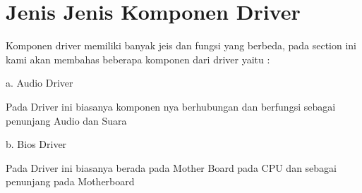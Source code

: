 \section {Jenis Jenis Komponen Driver}

Komponen driver memiliki banyak jeis dan fungsi yang berbeda, pada section ini kami akan membahas beberapa komponen dari driver yaitu : 

a. Audio Driver

Pada Driver ini biasanya komponen nya berhubungan dan berfungsi sebagai penunjang Audio dan Suara

b. Bios Driver

Pada Driver ini biasanya berada pada Mother Board pada CPU dan sebagai penunjang pada Motherboard

